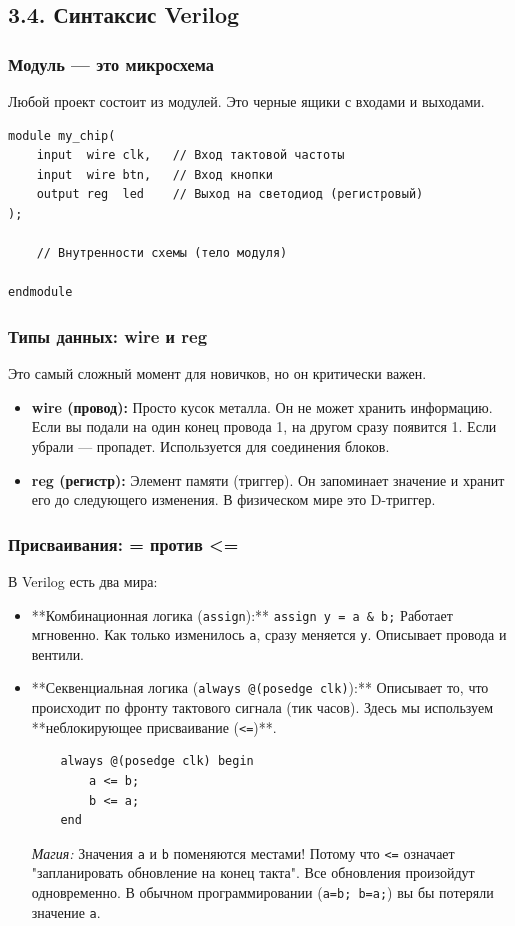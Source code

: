 \documentclass[12pt, a4paper]{article}
\begin{document}
\subsection{3.4. Синтаксис Verilog}

\subsubsection{Модуль — это микросхема}
Любой проект состоит из модулей. Это черные ящики с входами и выходами.

\begin{lstlisting}
module my_chip(
    input  wire clk,   // Вход тактовой частоты
    input  wire btn,   // Вход кнопки
    output reg  led    // Выход на светодиод (регистровый)
);

    // Внутренности схемы (тело модуля)

endmodule
\end{lstlisting}

\subsubsection{Типы данных: wire и reg}
Это самый сложный момент для новичков, но он критически важен.
\begin{itemize}
    \item \textbf{wire (провод):} Просто кусок металла. Он не может хранить информацию. Если вы подали на один конец провода 1, на другом сразу появится 1. Если убрали — пропадет. Используется для соединения блоков.
    \item \textbf{reg (регистр):} Элемент памяти (триггер). Он запоминает значение и хранит его до следующего изменения. В физическом мире это D-триггер.
\end{itemize}

\subsubsection{Присваивания: = против <=}
В Verilog есть два мира:
\begin{itemize}
    \item **Комбинационная логика (\texttt{assign}):**
    \texttt{assign y = a \& b;}
    Работает мгновенно. Как только изменилось \texttt{a}, сразу меняется \texttt{y}. Описывает провода и вентили.
    
    \item **Секвенциальная логика (\texttt{always @(posedge clk)}):**
    Описывает то, что происходит по фронту тактового сигнала (тик часов).
    Здесь мы используем **неблокирующее присваивание (\texttt{<=})**.
    
    \begin{lstlisting}
    always @(posedge clk) begin
        a <= b;
        b <= a;
    end
    \end{lstlisting}
    \textit{Магия:} Значения \texttt{a} и \texttt{b} поменяются местами! Потому что \texttt{<=} означает "запланировать обновление на конец такта". Все обновления произойдут одновременно. В обычном программировании (\texttt{a=b; b=a;}) вы бы потеряли значение \texttt{a}.
\end{itemize}
\end{document}
